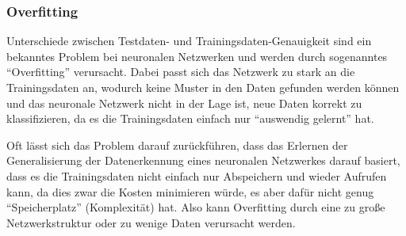 \documentclass[10pt]{article}
\newcommand{\form}[1]{#1} %
\newcommand{\feng}[1]{{#1}}
\newcommand{\sig}{\textrm{sig}}
\begin{document}
	


\subsubsection{Overfitting}

Unterschiede zwischen Testdaten- und Trainingsdaten-Genauigkeit sind ein bekanntes Problem bei neuronalen Netzwerken und werden durch sogenanntes \enquote{Overfitting} verursacht.
Dabei passt sich das Netzwerk zu stark an die Trainingsdaten an, wodurch keine Muster in den Daten gefunden werden können und das neuronale Netzwerk nicht in der Lage ist, neue Daten korrekt zu klassifizieren, da es die Trainingsdaten einfach nur \enquote{auswendig gelernt} hat.  %
 
Oft lässt sich das Problem darauf zurückführen, dass das Erlernen der Generalisierung der Datenerkennung eines neuronalen Netzwerkes darauf basiert, dass es die Trainingsdaten nicht einfach nur Abspeichern und wieder Aufrufen kann, da dies zwar die Kosten minimieren würde, es aber dafür nicht genug \enquote{Speicherplatz} (Komplexität) hat. Also kann Overfitting durch eine zu große Netzwerkstruktur oder zu wenige Daten verursacht werden.
 
\end{document}

